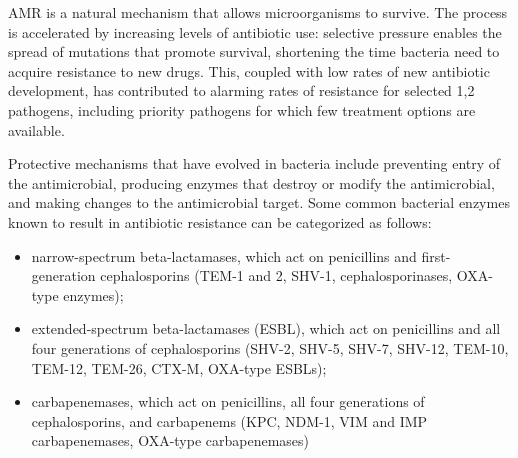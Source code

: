 \documentclass[
]{book}
\providecommand{\tightlist}{%
  \setlength{\itemsep}{0pt}\setlength{\parskip}{0pt}}
\begin{document}
AMR is a natural mechanism that allows microorganisms to survive. The process is accelerated by increasing levels of antibiotic use: selective pressure enables the spread of mutations that promote survival, shortening the time bacteria need to acquire resistance to new drugs. This, coupled with low rates of new antibiotic development, has contributed to alarming rates of resistance for selected 1,2 pathogens, including priority pathogens for which few treatment options are available.

Protective mechanisms that have evolved in bacteria include preventing entry of the antimicrobial, producing enzymes that destroy or modify the antimicrobial, and making changes to the antimicrobial target. Some common bacterial enzymes known to result in antibiotic resistance can be categorized as follows:

\begin{itemize}
\tightlist
\item
  narrow-spectrum beta-lactamases, which act on penicillins and first-generation cephalosporins (TEM-1 and 2, SHV-1, cephalosporinases, OXA-type enzymes);
\item
  extended-spectrum beta-lactamases (ESBL), which act on penicillins and all four generations of cephalosporins (SHV-2, SHV-5, SHV-7, SHV-12, TEM-10, TEM-12, TEM-26, CTX-M, OXA-type ESBLs);
\item
  carbapenemases, which act on penicillins, all four generations of cephalosporins, and carbapenems (KPC, NDM-1, VIM and IMP carbapenemases, OXA-type carbapenemases)
\end{itemize}
\end{document}
